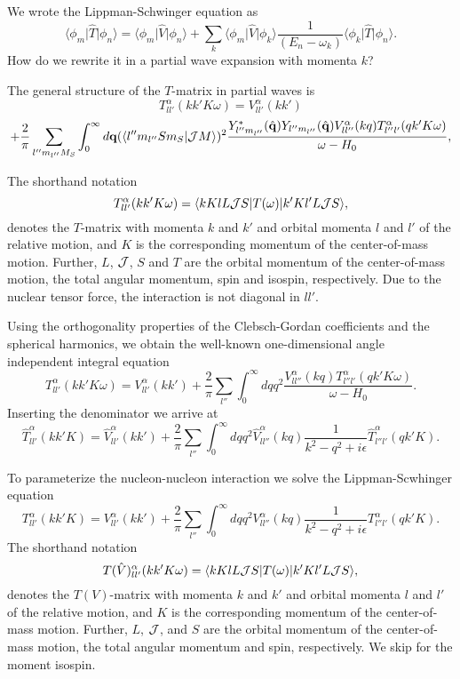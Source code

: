 \documentclass[graybox,sectrefs,envcountresetchap,open=right]{svmonodo}
\begin{document}
We wrote the Lippman-Schwinger equation as
\[
\langle \phi_m \vert\hat{T}\vert \phi_n \rangle =\langle \phi_m \vert\hat{V}\vert\phi_n \rangle+\sum_k \langle \phi_m \vert\hat{V}\vert \phi_k\rangle\frac{1}{(E_n -\omega_k)}\langle \phi_k \vert\hat{T}\vert \phi_n \rangle.
\]
How do we rewrite it in a partial wave expansion with momenta $k$?



The general structure of the $T$-matrix in partial waves is
\[
   T_{ll'}^{\alpha}(kk'K\omega)=V_{ll'}^{\alpha}(kk')
\]
\begin{equation}
   +{\displaystyle \frac{2}{\pi}\sum_{l''m_{l''}M_S}\int_{0}^{\infty} d \mathbf{q}
   (\langle l''m_{l''}Sm_S|{\cal J}M\rangle)^2
   \frac{Y_{l''m_{l''}}^*(\hat{\mathbf{q}})
   Y_{l''m_{l''}}(\hat{\mathbf{q}}) V_{ll''}^{\alpha}(kq)
   T_{l''l'}^{\alpha}(qk'K\omega)}
   {\omega -H_0}},
   \label{eq:bspartial}
\end{equation}


The  shorthand notation
\[
    T_{ll'}^{\alpha}(kk'K\omega)=
   \langle kKlL{\cal J}S\vert T(\omega)\vert k'Kl'L{\cal J}S\rangle,
\]
denotes the $T$-matrix
with momenta $k$ and $k'$ and orbital momenta $l$ and $l'$
of the relative motion, and
$K$ is the corresponding momentum of
the center-of-mass motion. Further, $L$, ${\cal J}$, $S$ and $T$
are the orbital momentum of the center-of-mass motion, the
total angular momentum,
spin and isospin, respectively. 
Due to the nuclear tensor force, the interaction is not diagonal in $ll'$.


Using the orthogonality
properties of the Clebsch-Gordan coefficients and the spherical harmonics,
we obtain the well-known
one-dimensional angle independent
integral equation
\[
   T_{ll'}^{\alpha}(kk'K\omega)=V_{ll'}^{\alpha}(kk')
   +\frac{2}{\pi}\sum_{l''}\int_{0}^{\infty} dqq^2
   \frac{V_{ll''}^{\alpha}(kq)
   T_{l''l'}^{\alpha}(qk'K\omega)}
   {\omega -H_0}.
\]
Inserting the denominator we arrive at 
\[
   \hat{T}_{ll'}^{\alpha}(kk'K)=\hat{V}_{ll'}^{\alpha}(kk')
   +\frac{2}{\pi}\sum_{l''}\int_{0}^{\infty} dqq^2
   \hat{V}_{ll''}^{\alpha}(kq)
   \frac{1}{k^2-q^2 +i\epsilon}
   \hat{T}_{l''l'}^{\alpha}(qk'K).
\]



To parameterize the nucleon-nucleon interaction we solve the Lippman-Scwhinger
equation
\[
   T_{ll'}^{\alpha}(kk'K)=V_{ll'}^{\alpha}(kk')
   +\frac{2}{\pi}\sum_{l''}\int_{0}^{\infty} dqq^2
   V_{ll''}^{\alpha}(kq)
   \frac{1}{k^2-q^2 +i\epsilon}
   T_{l''l'}^{\alpha}(qk'K).
\]
The  shorthand notation
\[
    T(\hat{V})_{ll'}^{\alpha}(kk'K\omega)=\langle kKlL{\cal J}S\vert T(\omega)\vert k'Kl'L{\cal J}S\rangle,
\]
denotes the $T(V)$-matrix
with momenta $k$ and $k'$ and orbital momenta $l$ and $l'$
of the relative motion, and
$K$ is the corresponding momentum of
the center-of-mass motion. Further, $L$, ${\cal J}$, and $S$
are the orbital momentum of the center-of-mass motion, the
total angular momentum and
spin, respectively. We skip for the moment isospin.
\end{document}
